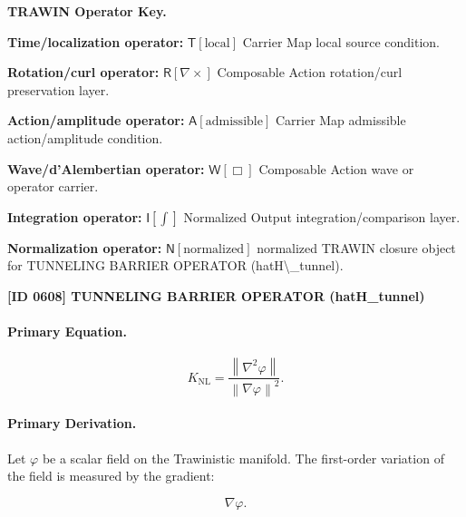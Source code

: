 \par\vspace{0.45\baselineskip}
\noindent\begin{minipage}[t]{\linewidth}
\begingroup
\small
\raggedright
\textbf{TRAWIN Operator Key.}\par
\noindent\textbf{Time/localization operator:} $\mathsf{T}\!\left[\mathrm{local}\right]$ Carrier Map local source condition.\par
\noindent\textbf{Rotation/curl operator:} $\mathsf{R}\!\left[\nabla\times\right]$ Composable Action rotation/curl preservation layer.\par
\noindent\textbf{Action/amplitude operator:} $\mathsf{A}\!\left[\mathrm{admissible}\right]$ Carrier Map admissible action/amplitude condition.\par
\noindent\textbf{Wave/d'Alembertian operator:} $\mathsf{W}\!\left[\Box\right]$ Composable Action wave or operator carrier.\par
\noindent\textbf{Integration operator:} $\mathsf{I}\!\left[\int\right]$ Normalized Output integration/comparison layer.\par
\noindent\textbf{Normalization operator:} $\mathsf{N}\!\left[\mathrm{normalized}\right]$ normalized TRAWIN closure object for TUNNELING BARRIER OPERATOR (hatH\textbackslash{}\_tunnel).\par
\endgroup
\end{minipage}

\clearpage
\noindent\textbf{[ID 0608] TUNNELING BARRIER OPERATOR (hatH\_tunnel)}\par
\vspace{0.35em}
\paragraph{Primary Equation.}
\begin{equation}
K_{\mathrm{NL}}
=
\frac{\left\lVert \nabla^{2}\varphi\right\rVert}
{\left\lVert \nabla\varphi\right\rVert^{2}} .
\end{equation}

\paragraph{Primary Derivation.}
Let $\varphi$ be a scalar field on the Trawinistic manifold.  
The first-order variation of the field is measured by the gradient:

\begin{equation}
\nabla\varphi .
\end{equation}

